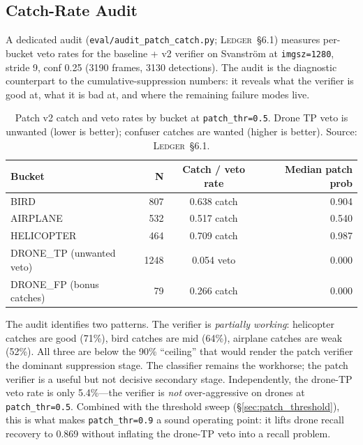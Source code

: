 \documentclass[12pt,a4paper,oneside,openright]{book}
\begin{document}
\subsection{Catch-Rate Audit}
\label{sec:patch_audit}

A dedicated audit (\texttt{eval/audit\_patch\_catch.py}; \textsc{Ledger}~\S6.1) measures per-bucket veto rates for the baseline + v2 verifier on Svanstr\"om at \texttt{imgsz=1280}, stride 9, conf 0.25 (3190 frames, 3130 detections). The audit is the diagnostic counterpart to the cumulative-suppression numbers: it reveals what the verifier is good at, what it is bad at, and where the remaining failure modes live.

\begin{table}[htbp]
    \centering
    \caption{Patch v2 catch and veto rates by bucket at \texttt{patch\_thr=0.5}. Drone TP veto is unwanted (lower is better); confuser catches are wanted (higher is better). Source: \textsc{Ledger}~\S6.1.}
    \label{tab:patch_audit}
    \begin{tabular}{lrcr}
        \toprule
        Bucket & N & Catch / veto rate & Median patch prob \\
        \midrule
        BIRD       & 807 & 0.638 catch & 0.904 \\
        AIRPLANE   & 532 & 0.517 catch & 0.540 \\
        HELICOPTER & 464 & 0.709 catch & 0.987 \\
        DRONE\_TP (unwanted veto) & 1248 & 0.054 veto & 0.000 \\
        DRONE\_FP (bonus catches) &   79 & 0.266 catch & 0.000 \\
        \bottomrule
    \end{tabular}
\end{table}

The audit identifies two patterns. The verifier is \emph{partially working}: helicopter catches are good (71\%), bird catches are mid (64\%), airplane catches are weak (52\%). All three are below the 90\% ``ceiling'' that would render the patch verifier the dominant suppression stage. The classifier remains the workhorse; the patch verifier is a useful but not decisive secondary stage. Independently, the drone-TP veto rate is only 5.4\%---the verifier is \emph{not} over-aggressive on drones at \texttt{patch\_thr=0.5}. Combined with the threshold sweep (\S\ref{sec:patch_threshold}), this is what makes \texttt{patch\_thr=0.9} a sound operating point: it lifts drone recall recovery to 0.869 without inflating the drone-TP veto into a recall problem.
\end{document}
